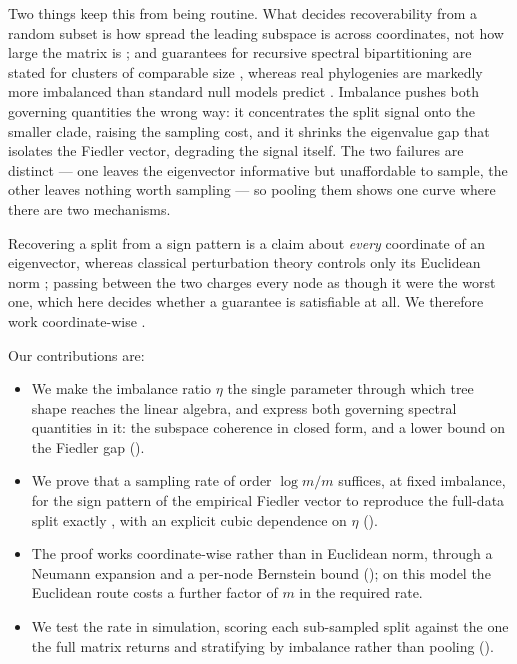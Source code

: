 Two things keep this from being routine. What decides recoverability from a
random subset is how spread the leading subspace is across coordinates, not how
large the matrix is \cite{chen2014completing}; and guarantees for recursive
spectral bipartitioning are stated for clusters of comparable size
\cite{Balakrishnan2011clustering, qinrohe2013regularized}, whereas real
phylogenies are markedly more imbalanced than standard null models predict
\cite{blum2006which, yule1925mathematical, kingman1982coalescent,
steel2001properties, aldous2001stochastic}. Imbalance pushes both governing
quantities the wrong way: it concentrates the split signal onto the smaller clade,
raising the sampling cost, and it shrinks the eigenvalue gap that isolates the
Fiedler vector, degrading the signal itself. The two failures are distinct ---
one leaves the eigenvector informative but unaffordable to sample, the other
leaves nothing worth sampling --- so pooling them shows one curve where there are
two mechanisms.

Recovering a split from a sign pattern is a claim about \emph{every} coordinate
of an eigenvector, whereas classical perturbation theory controls only its
Euclidean norm \cite{davis1970rotation};
passing between the two charges every node as though it were the worst one, which
here decides whether a guarantee is satisfiable at all. We therefore work
coordinate-wise \cite{eldridge2017unperturbed, fan2018eigenvector,
abbe2020entrywise, tropp2012userfriendly}.

Our contributions are:
\begin{itemize}
\item We make the imbalance ratio $\eta$ the single parameter through which tree
shape reaches the linear algebra, and express both governing spectral quantities
in it: the subspace coherence in closed form, and a lower bound on the Fiedler
gap ().

\item We prove that a sampling rate of order $\log m/m$ suffices, at fixed
imbalance, for the sign pattern of the empirical Fiedler vector to reproduce the
full-data split exactly \hp, with an explicit cubic dependence on $\eta$
(). 

\item The proof works coordinate-wise rather than in Euclidean norm, through a
Neumann expansion and a per-node Bernstein bound (); on this
model the Euclidean route costs a further factor of $m$ in the required rate.

\item We test the rate in simulation, scoring each sub-sampled split against the one the full
matrix returns \cite{strehlghosh2002cluster, fortunato2010community} and stratifying by imbalance
rather than pooling ().
\end{itemize}


